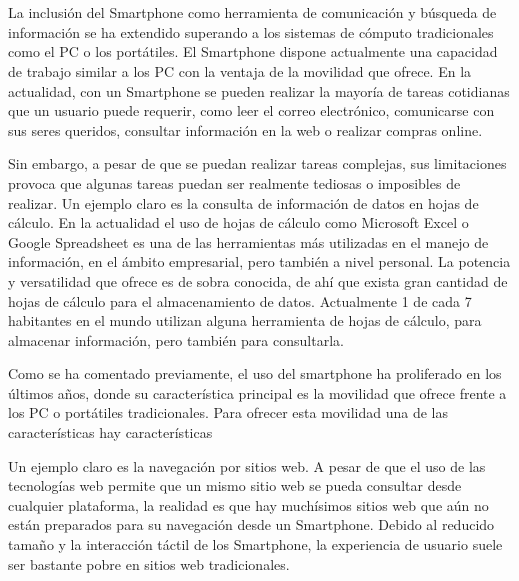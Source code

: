 \chapter{\introduction}


La inclusión del Smartphone como herramienta de comunicación y búsqueda de información se ha extendido superando a los sistemas de cómputo tradicionales como el PC o los portátiles. El Smartphone dispone actualmente una capacidad de trabajo similar a los PC con la ventaja de la movilidad que ofrece. En la actualidad, con un Smartphone se pueden realizar la mayoría de tareas cotidianas que un usuario puede requerir, como leer el correo electrónico, comunicarse con sus seres queridos, consultar información en la web o realizar compras online.

Sin embargo, a pesar de que se puedan realizar tareas complejas, sus limitaciones provoca que algunas tareas puedan ser realmente tediosas o imposibles de realizar. Un ejemplo claro es la consulta de información de datos en hojas de cálculo. En la actualidad el uso de hojas de cálculo como Microsoft Excel o Google Spreadsheet es una de las herramientas más utilizadas en el manejo de información, en el ámbito empresarial, pero también a nivel personal. La potencia y versatilidad que ofrece es de sobra conocida, de ahí que exista gran cantidad de hojas de cálculo para el almacenamiento de datos. Actualmente 1 de cada 7 habitantes en el mundo utilizan alguna herramienta de hojas de cálculo, para almacenar información, pero también para consultarla. %

Como se ha comentado previamente, el uso del smartphone ha proliferado en los últimos años, donde su característica principal es la movilidad que ofrece frente a los PC o portátiles tradicionales. Para ofrecer esta movilidad una de las características hay características








Un ejemplo claro es la navegación por sitios web. A pesar de que el uso de las tecnologías web permite que un mismo sitio web se pueda consultar desde cualquier plataforma, la realidad es que hay muchísimos sitios web que aún no están preparados para su navegación desde un Smartphone. Debido al reducido tamaño y la interacción táctil de los Smartphone, la experiencia de usuario suele ser bastante pobre en sitios web tradicionales.

